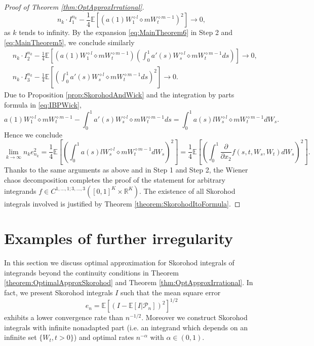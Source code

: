 \documentclass[a4paper,11pt,reqno]{amsart}
\theoremstyle{plain}
\def\R{\mathbb{R}}
\def\ex{\mathbb{E}}
\numberwithin{equation}{section}
\begin{document}
\begin{proof}[Proof of Theorem \ref{thm:OptApproxIrrational}]
\[
n_k \cdot I^{n_k}_1 - \frac{1}{4} \ex\left[\left(a(1) W_1^{\diamond l} \diamond mW_t^{\diamond m-1}\right)^2\right] \rightarrow 0,
\]
as $k$ tends to infinity. By the expansion \eqref{eq:MainTheorem6} in Step 2 and \eqref{eq:MainTheorem5}, we conclude similarly
\begin{align*}
&n_k \cdot I^{n_k}_2 - \frac{1}{4} \ex\left[\left(a(1) W_1^{\diamond l} \diamond mW_t^{\diamond m-1}\right) \left(\int_{0}^{1}a'(s) W_s^{\diamond l} \diamond m W_t^{\diamond m-1} ds\right)\right] \rightarrow 0,\\
&n_k \cdot I^{n_k}_3 - \frac{1}{4} \ex\left[ \left(\int_{0}^{1}a'(s) W_s^{\diamond l} \diamond m W_t^{\diamond m-1} ds\right)^2\right] \rightarrow 0.
\end{align*}
Due to Proposition \ref{prop:SkorohodAndWick} and the integration by parts formula in \eqref{eq:IBPWick},
$$
a(1) W_1^{\diamond l} \diamond mW_t^{\diamond m-1} - \int_{0}^{1}a'(s) W_s^{\diamond l} \diamond m W_t^{\diamond m-1} ds = \int_{0}^{1} a(s) l W_s^{\diamond l} \diamond m W_t^{\diamond m-1} dW_s.
$$
Hence we conclude
\[
\lim_{k \rightarrow \infty} n_k e_{n_k}^2 = \frac{1}{4}\ex\left[\left(\int_{0}^{1} a(s) l W_s^{\diamond l} \diamond m W_t^{\diamond m-1} dW_s\right)^2\right]= \frac{1}{4}\ex\left[\left(\int_{0}^{1}\dfrac{\partial}{\partial x_2} f(s,t,W_s, W_{t}) dW_s\right)^2\right].
\]
Thanks to the same arguments as above and in Step 1 and Step 2, the Wiener chaos decomposition completes the proof of the statement for arbitrary integrands $f \in C^{1,\ldots,1;3,\ldots, 3}([0,1]^K\times \R^{K})$. The existence of all Skorohod integrals involved is justified by Theorem \ref{theorem:SkorohodItoFormula}. 
\end{proof}


\section{Examples of further irregularity}\label{section_4}

In this section we discuss optimal approximation for Skorohod integrals of integrands beyond the continuity conditions in Theorem \ref{theorem:OptimalApproxSkorohod} and Theorem \ref{thm:OptApproxIrrational}. In fact, we present Skorohod integrals $I$
such that the mean square error
$$
e_n = \ex[(I - \ex[I|\mathcal{P}_n])^2]^{1/2}
$$
exhibits a lower convergence rate than $n^{-1/2}$. Moreover we construct Skorohod integrals with infinite nonadapted part (i.e. an integrand which depends on an infinite set $\{W_{t}, t>0\}$) and optimal rates $n^{-\alpha}$ with $\alpha \in (0,1)$. 
\end{document}
